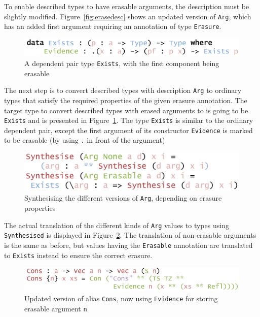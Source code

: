 \documentclass{ituthesis}
\newcommand{\ttconstructor}[1]{\textcolor{constructor-color}{\texttt{#1}}}
\newcommand{\tttype}[1]{\textcolor{type-color}{\texttt{#1}}}
\newcommand{\ttdec}[1]{\textcolor{declared-var-color}{\texttt{#1}}}
\newcommand{\ttvar}[1]{\textcolor{local-var-color}{\texttt{#1}}}
\theoremstyle{break}
\begin{document}
To enable described types to have erasable arguments, the description must be slightly modified.
Figure~\ref{fig:erasedesc} shows an updated version of \ttconstructor{Arg}, which has an added first argument requiring an annotation of type \tttype{Erasure}.

\begin{figure}[ht]
\begin{center}
    \includegraphics[scale=0.5]{Figures/ExistsType.png}
\end{center}
\caption{A dependent pair type \tttype{Exists}, with the first component being erasable}
\label{fig:existsty}
\end{figure}

The next step is to convert described types with description \ttconstructor{Arg} to ordinary types that satisfy the required properties of the given erasure annotation.
The target type to convert described types with erased arguments to is going to be \tttype{Exists} and is presented in Figure~\ref{fig:existsty}.
The type \tttype{Exists} is similar to the ordinary dependent pair, except the first argument of its constructor \ttconstructor{Evidence} is marked to be erasable (by using \texttt{.} in front of the argument)

\begin{figure}[ht]
\begin{center}
    \includegraphics[scale=0.5]{Figures/SynthesisingDataWithErasure.png}
\end{center}
\caption{Synthesising the different versions of \ttconstructor{Arg}, depending on erasure properties}
\label{fig:erasesynth}
\end{figure}

The actual translation of the different kinds of \ttconstructor{Arg} values to types using \ttdec{Synthesised} is displayed in Figure~\ref{fig:erasesynth}.
The translation of non-erasable arguments is the same as before, but values having the \ttconstructor{Erasable} annotation are translated to \tttype{Exists} instead to ensure the correct erasure.

\begin{figure}[ht]
\begin{center}
    \includegraphics[scale=0.5]{Figures/VectorSynthesisedConstructorsWithErasure.png}
\end{center}
\caption{Updated version of alias \ttdec{Cons}, now using \ttconstructor{Evidence} for storing erasable argument \ttvar{n}}
\label{fig:erasecons}
\end{figure}
\end{document}
